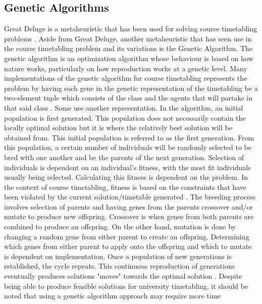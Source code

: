 
\subsection{Genetic Algorithms}
Great Deluge is a metaheuristic \cite{intro-gd-dueck} that has been used for solving course timetabling problems \cite{gd-burke}\cite{nlgd-landa-silva}\cite{nlgdrl-obit}. Aside from Great Deluge, another metaheuristic that has seen use in the course timetabling problem and its variations is the Genetic Algorithm. The genetic algorithm is an optimization algorithm whose behaviour is based on how nature works, particularly on how reproduction works at a genetic level. Many implementations of the genetic algorithm for course timetabling represents the problem by having each gene in the genetic representation of the timetabling be a two-element tuple which consists of the class and the agents that will partake in that said class \cite{alves-novel-recursive}\cite{raghavjee-ga-south-africa}\cite{supachate-noval-approach-ga-thai}. Some use another representation. In the algorithm, an initial population is first generated. This population does not necessarily contain the locally optimal solution but it is where the relatively best solution will be obtained from. This initial population is referred to as the first generation. From this population, a certain number of individuals will be randomly selected to be bred with one another and be the parents of the next generation. Selection of individuals is dependent on an individual's fitness, with the most fit individuals usually being selected. Calculating this fitness is dependent on the problem. In the context of course timetabling, fitness is based on the constraints that have been violated by the current solution/timetable generated \cite{alves-novel-recursive}\cite{raghavjee-ga-south-africa}\cite{johan-ga-sa-comparison}\cite{yik-ga-timetabling}\cite{supachate-noval-approach-ga-thai}\cite{wutthipong-performance-study-genetic-operators}\cite{sanjay-an-application-of-ga}. The breeding process involves selection of parents and having genes from the parents crossover and/or mutate to produce new offspring. Crossover is when genes from both parents are combined to produce an offspring. On the other hand, mutation is done by changing a random gene from either parent to create an offspring. Determining which genes from either parent to apply onto the offspring and which to mutate is dependent on implementation. Once a population of new generations is established, the cycle repeats. This continuous reproduction of generations eventually produces solutions "moves" towards the optimal solution \cite{what-is-ga}. Despite being able to produce feasible solutions for university timetabling, it should be noted that using a genetic algorithm approach may require more time 